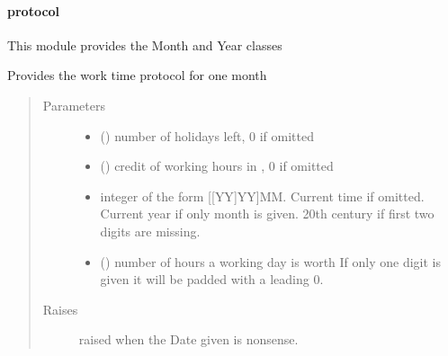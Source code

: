 \documentclass[letterpaper,10pt,english]{sphinxmanual}
\begin{document}
\paragraph{protocol}
\label{\detokenize{devmanual:module-protocol}}\label{\detokenize{devmanual:protocol}}
This module provides the Month and Year classes

\begin{fulllineitems}
\label{\detokenize{devmanual:protocol.Month}}
Provides the work time protocol for one month
\begin{quote}\begin{description}
\item[{Parameters}] \leavevmode\begin{itemize}
\item {} 
 () \textendash{} number of holidays left, 0 if omitted

\item {} 
 () \textendash{} credit of working hours in , 0 if omitted

\item {} 
 \textendash{} integer of the form {[}{[}YY{]}YY{]}MM. Current time if omitted. Current year if only month is given. 20th century if first two digits are missing.

\item {} 
 () \textendash{} number of hours a working day is worth
If only one digit is given it will be padded with a leading 0.

\end{itemize}

\item[{Raises}] \leavevmode
{} \textendash{} raised when the Date given is nonsense.


\end{description}
\end{quote}
\end{fulllineitems}
\end{document}
